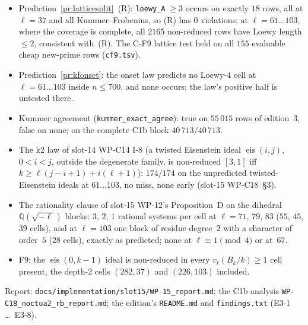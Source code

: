 \documentclass[11pt]{article}
\theoremstyle{remark}
\newcommand{\Q}{\mathbb{Q}}
\begin{document}
\begin{itemize}
\item Prediction~\ref{pr:latticesplit}~(R): \texttt{loewy\_A}$\;\ge3$ occurs on exactly $18$ rows, all at $\ell=37$ and all
  Kummer--Frobenius, so (R) has $0$ violations; at $\ell=61\ldots103$, where the coverage is complete, all $2165$ non-reduced rows
  have Loewy length $\le2$, consistent with~(R). The C-F9 lattice test held on all $155$ evaluable cheap new-prime rows
  (\texttt{cf9.tsv}).
\item Prediction~\ref{pr:kfonset}: the onset law predicts no Loewy-$4$ cell at $\ell=61\ldots103$ inside $n\le700$, and none occurs;
  the law's positive half is untested there.
\item Kummer agreement (\texttt{kummer\_exact\_agree}): true on $55\,015$ rows of edition~3, false on none; on the complete C1b block
  $40\,713/40\,713$.
\item The k2 law of slot-14 WP-C14 I-8 (a twisted Eisenstein ideal $\operatorname{eis}(i,j)$, $0<i<j$, outside the degenerate family,
  is non-reduced $[3,1]$ iff $k\ge\ell(j-i+1)+i(\ell+1)$): $174/174$ on the unpredicted twisted-Eisenstein ideals at $61\ldots103$,
  no miss, none early (slot-15 WP-C18~\S3).
\item The rationality clause of slot-15 WP-12's Proposition~D on the dihedral $\Q(\sqrt{-\ell})$ blocks: $3$, $2$, $1$ rational
  systems per cell at $\ell=71$, $79$, $83$ ($55$, $45$, $39$ cells), and at $\ell=103$ one block of residue degree~$2$ with a
  character of order~$5$ ($28$ cells), exactly as predicted; none at $\ell\equiv1\pmod4$ or at~$67$.
\item F9: the $\operatorname{eis}(0,k-1)$ ideal is non-reduced in every $v_\ell(B_k/k)\ge1$ cell present, the depth-$2$ cells
  $(282,37)$ and $(226,103)$ included.
\end{itemize}
Report: \texttt{docs/implementation/slot15/WP-15\_report.md}; the C1b analysis \texttt{WP-C18\_noctua2\_rb\_report.md}; the
edition's \texttt{README.md} and \texttt{findings.txt} (E3-1 \ldots\ E3-8).
\end{document}
